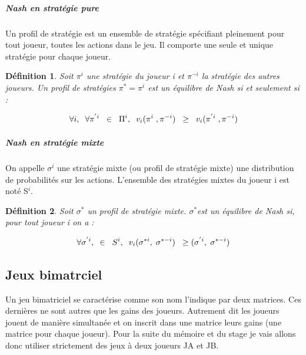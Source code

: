 \documentclass[a4paper, 12pt, twoside]{article}
\newtheorem{definition}{Définition}
\begin{document}
\subparagraph{Nash en stratégie pure}{Un profil de stratégie est un ensemble de stratégie spécifiant pleinement pour tout joueur, toutes les actions dans le jeu. Il comporte une seule et unique stratégie pour chaque joueur.}
\begin{definition}
Soit $\pi^{i} $ une stratégie du joueur i et $ \pi^{-i} $ la stratégie des autres joueurs. Un profil de stratégies $\pi^{*} = \pi^{i}$ est un équilibre de Nash si et seulement si :
\end{definition}
\begin{align*}
\forall i, \hspace{0,2 cm} \forall \pi^{'i} \hspace{0,2 cm} \in \hspace{0,2 cm} \Pi^{i}, \hspace{0,2 cm} v_{i}(\pi^{i}\hspace{0,1 cm}, \pi^{-i}) \hspace{0,2 cm} \geq \hspace{0,2 cm} v_{i}(\pi^{'i}\hspace{0,1 cm}, \pi^{-i})
\end{align*}

\subparagraph{Nash en stratégie mixte}{On appelle $\sigma^{i}$  une stratégie mixte (ou profil de stratégie mixte) une distribution de probabilités sur les actions. L'ensemble des stratégies mixtes du joueur i est noté S$^{i}$.}
\begin{definition}
Soit $\sigma ^{*} $ un profil de stratégie mixte. $\sigma ^{*} $est un équilibre de Nash si, pour tout joueur i on a : 
\end{definition}
\begin{align*}
\forall \sigma ^{'i}, \hspace{0,2 cm} \in \hspace{0,2 cm} S^{i}, \hspace{0,2 cm} v_{i}(\sigma ^{*i} , \hspace{0,1 cm} \sigma^{*-i}) \hspace{0,2 cm} \geq (\sigma ^{'i} , \hspace{0,1 cm} \sigma^{*-i})
\end{align*}


\subsection{Jeux bimatrciel}
Un jeu bimatriciel se caractérise comme son nom l'indique par deux matrices. Ces dernières ne sont autres que les gains des joueurs. Autrement dit les joueurs jouent de manière simultanée et on inscrit dans une matrice leurs gains (une matrice pour chaque joueur). Pour la suite du mémoire et du stage je vais  allons donc utiliser strictement des jeux à deux joueurs JA et \textsf{JB}.
\end{document}
